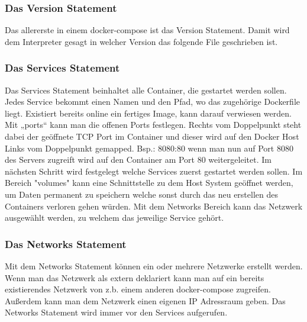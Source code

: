 \subsubsection{Das Version Statement}
Das allererste in einem docker-compose ist das Version Statement. Damit wird dem Interpreter gesagt in welcher Version das folgende File geschrieben ist.
\subsubsection{Das Services Statement}
Das Services Statement beinhaltet alle Container, die gestartet werden sollen. Jedes Service bekommt einen Namen und den Pfad, wo das zugehörige Dockerfile liegt. Existiert bereits online ein fertiges Image, kann darauf verwiesen werden. Mit „ports“ kann man die offenen Ports festlegen. Rechts vom Doppelpunkt steht dabei der geöffnete TCP Port im Container und dieser wird auf den Docker Host Links vom Doppelpunkt gemapped. Bsp.: 8080:80 wenn man nun auf Port 8080 des Servers zugreift wird auf den Container am Port 80 weitergeleitet. Im nächsten Schritt wird festgelegt welche Services zuerst gestartet werden sollen. Im Bereich "volumes" kann eine Schnittstelle zu dem Host System geöffnet werden, um Daten permanent zu speichern welche sonst durch das neu erstellen des Containers verloren gehen würden. Mit dem Networks Bereich kann das Netzwerk ausgewählt werden, zu welchem das jeweilige Service gehört.
\subsubsection{Das Networks Statement}
Mit dem Networks Statement können ein oder mehrere Netzwerke erstellt werden. Wenn man das Netzwerk als extern deklariert kann man auf ein bereits existierendes Netzwerk von z.b. einem anderen docker-compose zugreifen. Außerdem kann man dem Netzwerk einen eigenen IP Adressraum geben. Das Networks Statement wird immer vor den Services aufgerufen.



